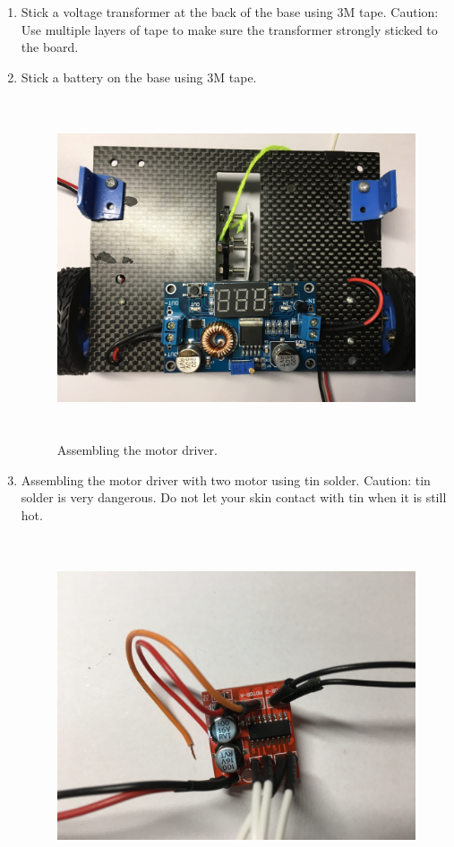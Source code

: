 \begin{enumerate}
\begin{enumerate}
	\item Stick a voltage transformer at the back of the base using 3M tape. Caution: Use multiple layers of tape to make sure the transformer strongly sticked to the board.
	\item Stick a battery on the base using 3M tape. \\
	\begin{figure}[H]
	\begin{center}
	\includegraphics[height=10cm]{figure/procedure/p6}
	\end{center}
 	\caption{Assembling the motor driver. \label{fig:assMotor}}
	\end{figure}
	\item Assembling the motor driver with two motor using tin solder. Caution: tin solder is very dangerous. Do not let your skin contact with tin when it is still hot.\\
	\begin{figure}[H]
	\begin{center}
	\includegraphics[height=10cm]{figure/procedure/p7}

\end{center}
\end{figure}
\end{enumerate}
\end{enumerate}
